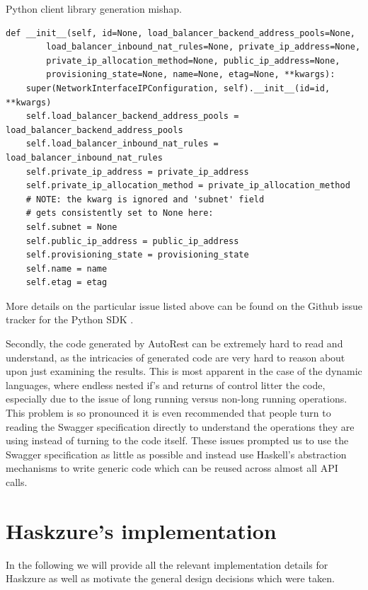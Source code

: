 \documentclass[11pt]{report}
\begin{document}
\begin{listing}[H]
\caption{Python client library generation mishap.}
\label{listing:pythonLibraryFailure}
\begin{verbatim}
def __init__(self, id=None, load_balancer_backend_address_pools=None,
        load_balancer_inbound_nat_rules=None, private_ip_address=None,
        private_ip_allocation_method=None, public_ip_address=None,
        provisioning_state=None, name=None, etag=None, **kwargs):
    super(NetworkInterfaceIPConfiguration, self).__init__(id=id, **kwargs)
    self.load_balancer_backend_address_pools = load_balancer_backend_address_pools
    self.load_balancer_inbound_nat_rules = load_balancer_inbound_nat_rules
    self.private_ip_address = private_ip_address
    self.private_ip_allocation_method = private_ip_allocation_method
    # NOTE: the kwarg is ignored and 'subnet' field
    # gets consistently set to None here:
    self.subnet = None
    self.public_ip_address = public_ip_address
    self.provisioning_state = provisioning_state
    self.name = name
    self.etag = etag
\end{verbatim}
\end{listing}

More details on the particular issue listed above can be found on the Github
issue tracker for the Python SDK \cite{pythonSDKIssue}.

Secondly, the code generated by AutoRest can be extremely hard to read and
understand, as the intricacies of generated code are very hard to reason about
upon just examining the results. This is most apparent in the case of the
dynamic languages, where endless nested if's and returns of control litter the
code, especially due to the issue of long running versus non-long running
operations. This problem is so pronounced it is even recommended that people
turn to reading the Swagger specification directly to understand the operations
they are using instead of turning to the code itself. \newline
These issues prompted us to use the Swagger specification as
little as possible and instead use Haskell's abstraction mechanisms to write
generic code which can be reused across almost all API calls.


\chapter{Haskzure's implementation}

In the following we will provide all the relevant implementation details for
Haskzure as well as motivate the general design decisions which were taken.
\end{document}
